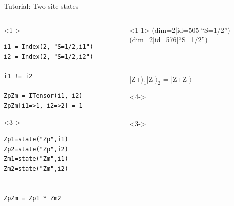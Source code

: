 \begin{frame}[fragile]{Tutorial: Two-site states}

\begin{columns}

\begin{column}{4.5cm}

\begin{onlyenv}<1->
\begin{lstlisting}[language=JuliaLocal, style=julia, mathescape, basicstyle=\scriptsize\ttfamily]
i1 = Index(2, "S=1/2,i1")
i2 = Index(2, "S=1/2,i2")

i1 != i2

ZpZm = ITensor(i1, i2)
ZpZm[i1=>1, i2=>2] = 1
\end{lstlisting}
\end{onlyenv}

\begin{onlyenv}<3->
\begin{lstlisting}[language=JuliaLocal, style=julia, basicstyle=\scriptsize\ttfamily]
Zp1=state("Zp",i1)
Zp2=state("Zp",i2)
Zm1=state("Zm",i1)
Zm2=state("Zm",i2)


ZpZm = Zp1 * Zm2
\end{lstlisting}
\end{onlyenv}

\end{column}

\begin{column}{5cm}

\begin{onlyenv}<1-1>
(dim=2|id=505|``S=1/2'') \\
(dim=2|id=576|``S=1/2'') \\
~\\
~\\
~\\
|Z+$\rangle_1$|Z-$\rangle_2$ = |Z+Z-$\rangle$ \\
\end{onlyenv}

\begin{onlyenv}<4->
~\\
~\\
\end{onlyenv}

\begin{onlyenv}<3->
~\\
\end{onlyenv}


\end{column}
\end{columns}
\end{frame}
